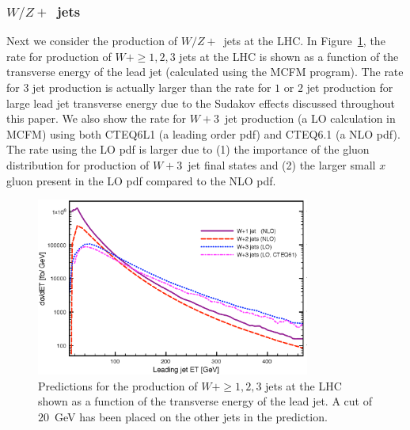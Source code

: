 \documentclass[12pt]{iopart}
\begin{document}
\subsubsection{$W/Z+$~jets}
\label{sec:wjets_lhc}

Next we consider the production of $W/Z+$~jets at the LHC. In Figure~\ref{fig:lhc_Wjet}, the rate for production of
$W+\ge 1,2,3$ jets at the LHC is shown as a function of the transverse energy of the lead jet (calculated using the MCFM program). The rate for $3$ jet production is actually
larger than the rate for $1$ or $2$ jet production for large lead jet transverse energy due to the Sudakov effects discussed throughout this
paper. We also show the rate for $W + 3$~jet production (a LO calculation in MCFM) using both CTEQ6L1 (a leading order pdf) and CTEQ6.1
(a NLO pdf). The rate using the LO pdf is larger due to (1) the importance of the gluon distribution for production of $W + 3$~jet final
states and (2) the larger small $x$ gluon present in the LO pdf compared to the NLO pdf. 
%
\begin{figure}
\begin{center}
\includegraphics[width=9cm]{lhcptplot.eps}
\end{center}
\caption{
Predictions for the production of $W+\ge 1,2,3$ jets at the LHC shown as a function of the transverse energy of the lead jet. A cut of
$20$~GeV has been placed on the other jets in the prediction. 
\label{fig:lhc_Wjet}}
\end{figure}
%
\end{document}
